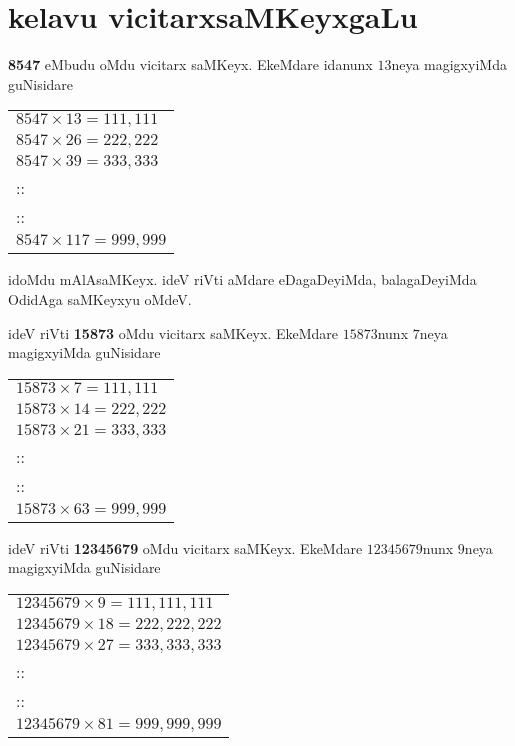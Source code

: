\chapter{kelavu vicitarxsaMKeyxgaLu}\label{chap11}

\begin{multicols}{2}
\noindent
{\rm\bfseries 8547} eMbudu oMdu vicitarx saMKeyx. EkeMdare idanunx $13$neya magigxyiMda guNi\-sidare
\begin{center}
\begin{tabular}{l}
$8547\times 13=111,111$\\[2pt]
$8547\times 26=222,222$\\[2pt]
$8547\times 39=333,333$\\[2pt]
::\\
::\\
{\small $8547\times 117=999,999$}
\end{tabular}
\end{center}

idoMdu mAlAsaMKeyx. ideV riVti aMdare eDagaDeyiMda, balagaDe\-yiMda OdidAga saMKeyxyu oMdeV.

ideV riVti {\rm\bfseries 15873} oMdu \hbox{vicitarx} saMKeyx. EkeMdare $15873$nunx $7$neya magigxyiMda guNisidare
\begin{center}
\begin{tabular}{l}
$15873\times 7=111,111$\\[2pt]
$15873\times 14=222,222$\\[2pt]
$15873\times 21=333,333$\\[2pt]
::\\
::\\
{\small $15873\times 63=999,999$}
\end{tabular}
\end{center}

ideV riVti {\rm\bfseries 12345679} oMdu \hbox{vicitarx} saMKeyx. EkeMdare $12345679$nunx $9$neya magigxyiMda guNisidare
\begin{center}
{\fontsize{11}{13}\selectfont
\begin{tabular}{l}
$12345679\times 9=111,111,111$\\[2pt]
$12345679\times 18=222,222,222$\\[2pt]
$12345679\times 27=333,333,333$\\[2pt]
::\\
::\\
{\small $12345679\times 81=999,999,999$}
\end{tabular}}
\end{center}


\end{multicols}
